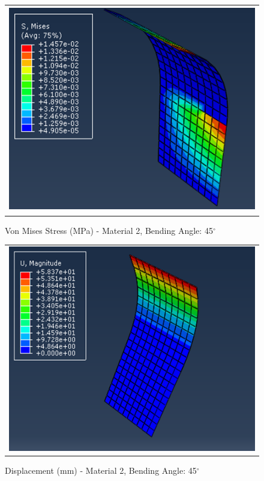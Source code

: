 \documentclass[a4paper,12pt]{article}
\numberwithin{equation}{section}
\numberwithin{figure}{section}
\begin{document}
\begin{figure}[H]
  \centering
  \begin{tabular}{@{}c@{}}
    \includegraphics[width=0.7\linewidth,height=255pt]{Results/Bending/M2_VMS_45.png} \\
  \end{tabular}
  \caption{Von Mises Stress (MPa) - Material 2,  Bending Angle: 45$^{\circ}$ }
\end{figure}

\begin{figure}[H]
  \centering
  \begin{tabular}{@{}c@{}}
    \includegraphics[width=0.7\linewidth,height=255pt]{Results/Bending/M2_DIS_45.png} \\
  \end{tabular}
  \caption{Displacement (mm) - Material 2, Bending Angle: 45$^{\circ}$ }
\end{figure}
\end{document}
